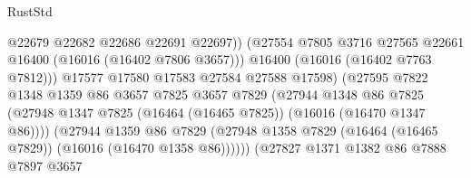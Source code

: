 \begin{lexlean}{RustStd}
\begin{coremodule}
                                            @22679
                                            @22682
                                            @22686
                                            @22691
                                            @22697))
                                        (@27554
                                          @7805
                                          @3716
                                          @27565
                                          @22661
                                          @16400
                                          (@16016 (@16402 @7806 @3657)))
                                        @16400
                                        (@16016 (@16402 @7763 @7812)))
                                      @17577
                                      @17580
                                      @17583
                                      @27584
                                      @27588
                                      @17598)
                                    (@27595
                                      @7822
                                      @1348
                                      @1359
                                      @86
                                      @3657
                                      @7825
                                      @3657
                                      @7829
                                      (@27944
                                        @1348
                                        @86
                                        @7825
                                        (@27948
                                          @1347
                                          @7825
                                          (@16464 (@16465 @7825))
                                          (@16016 (@16470 @1347 @86))))
                                      (@27944
                                        @1359
                                        @86
                                        @7829
                                        (@27948
                                          @1358
                                          @7829
                                          (@16464 (@16465 @7829))
                                          (@16016 (@16470 @1358 @86))))))
                                  (@27827
                                    @1371
                                    @1382
                                    @86
                                    @7888
                                    @7897
                                    @3657

\end{coremodule}
\end{lexlean}
